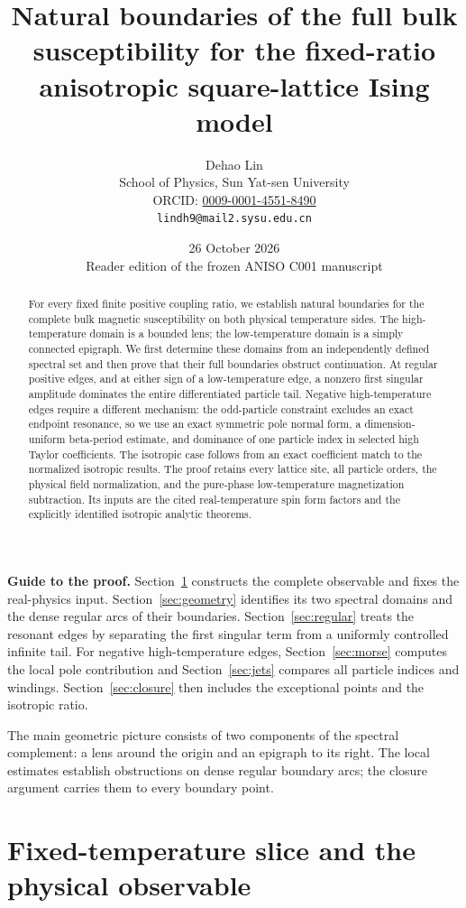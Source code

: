 \documentclass[11pt]{article}
\title{Natural boundaries of the full bulk susceptibility\newline
for the fixed-ratio anisotropic square-lattice Ising model}
\author{Dehao Lin\\{\small School of Physics, Sun Yat-sen University}\\{\small ORCID: \href{https://orcid.org/0009-0001-4551-8490}{0009-0001-4551-8490}}\\{\small\texttt{lindh9@mail2.sysu.edu.cn}}}
\date{26 October 2026\\{\small Reader edition of the frozen ANISO C001 manuscript}}
\numberwithin{equation}{section}
\theoremstyle{definition}
\begin{document}
\maketitle
\begin{abstract}
For every fixed finite positive coupling ratio, we establish natural
boundaries for the complete bulk magnetic susceptibility on both
physical temperature sides. The high-temperature domain is a bounded
lens; the low-temperature domain is a simply connected epigraph.
We first determine these domains from an independently defined spectral
set and then prove that their full boundaries obstruct continuation.
At regular positive edges, and at either sign of a low-temperature edge,
a nonzero first singular amplitude dominates the entire differentiated
particle tail. Negative high-temperature edges require a different
mechanism: the odd-particle constraint excludes an exact endpoint
resonance, so we use an exact symmetric pole normal form, a
dimension-uniform beta-period estimate, and dominance of one particle
index in selected high Taylor coefficients. The isotropic case follows
from an exact coefficient match to the normalized isotropic results.
The proof retains every lattice site, all particle orders, the physical
field normalization, and the pure-phase low-temperature magnetization
subtraction. Its inputs are the cited real-temperature spin form factors
and the explicitly identified isotropic analytic theorems.
\end{abstract}
\tableofcontents

\medskip
\noindent\textbf{Guide to the proof.}
Section~\ref{sec:physical} constructs the complete observable and fixes
the real-physics input. Section~\ref{sec:geometry} identifies its two
spectral domains and the dense regular arcs of their boundaries.
Section~\ref{sec:regular} treats the resonant edges by separating the
first singular term from a uniformly controlled infinite tail.
For negative high-temperature edges, Section~\ref{sec:morse} computes
the local pole contribution and Section~\ref{sec:jets} compares all
particle indices and windings. Section~\ref{sec:closure} then includes
the exceptional points and the isotropic ratio.

The main geometric picture consists of two components of the spectral
complement: a lens around the origin and an epigraph to its right.
The local estimates establish obstructions on dense regular boundary
arcs; the closure argument carries them to every boundary point.

\section{Fixed-temperature slice and the physical observable}\label{sec:physical}
\end{document}
